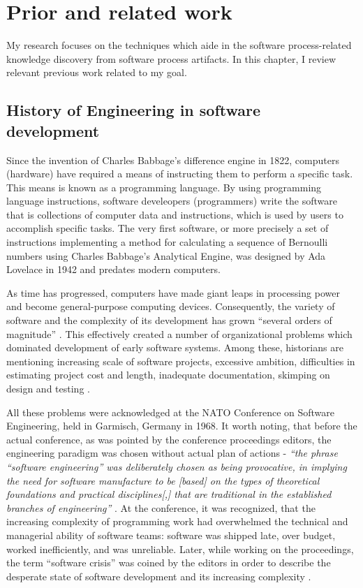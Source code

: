 \chapter{Prior and related work}\label{chapter_background_work}
My research focuses on the techniques which aide in the software process-related knowledge 
discovery from software process artifacts. In this chapter, I review relevant previous work related to my goal.

\section{History of Engineering in software development}
Since the invention of Charles Babbage’s difference engine in 1822, computers (hardware) 
have required a means of instructing them to perform a specific task. This means is known 
as a programming language. By using programming language instructions, 
software develeopers (programmers) write the software that is collections of computer data 
and instructions, which is used by users to accomplish specific tasks. 
The very first software, or more precisely a set of instructions implementing a method for 
calculating a sequence of Bernoulli numbers using Charles Babbage's Analytical Engine, was 
designed by Ada Lovelace in 1942 and predates modern computers. 

As time has progressed, computers have made giant leaps in processing power and become 
general-purpose computing devices. Consequently, the variety of software and 
the complexity of its development has grown ``several orders of magnitude'' \cite{naur_crisis_68}. 
This effectively created a number of organizational problems which dominated development of 
early software systems. Among these, historians are mentioning increasing scale of software projects, 
excessive ambition, difficulties in estimating project cost and length, inadequate documentation, 
skimping on design and testing \cite{mahoney_roots_1990} \cite{citeulike:12748733} 
\cite{citeulike:833903}.

All these problems were acknowledged at the NATO Conference on Software Engineering, held in Garmisch,
Germany in 1968. It worth noting, that before the actual conference, as was pointed by the 
conference proceedings editors, the engineering paradigm was chosen without actual plan of actions - 
\textit{``the phrase ``software engineering'' was deliberately chosen as being provocative, in implying 
the need for software manufacture to be [based] on the types of theoretical foundations and practical 
disciplines[,] that are traditional in the established branches of engineering''} \cite{citeulike:12787786}.
At the conference, it was recognized, that the increasing complexity of programming 
work had overwhelmed the technical and managerial ability of software teams: software was shipped late,
over budget, worked inefficiently, and was unreliable. Later, while working on the proceedings, the term 
``software crisis'' was coined by the editors in order to describe the desperate state of 
software development and its increasing complexity \cite{naur_crisis_68}.

